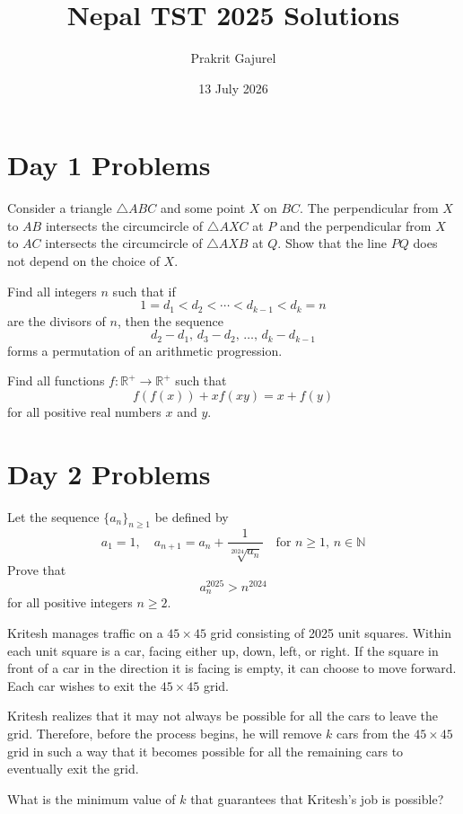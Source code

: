 \documentclass[11pt]{scrartcl}
\begin{document}
\title{Nepal TST 2025 Solutions}
\author{Prakrit Gajurel}
\date{13 July 2026}
\maketitle

\section{Day 1 Problems}

\begin{problem}
    Consider a triangle $\triangle ABC$ and some point $X$ on $BC$. The perpendicular from
    $X$ to $AB$ intersects the circumcircle of $\triangle AXC$ at $P$ and the perpendicular
    from $X$ to $AC$ intersects the circumcircle of $\triangle AXB$ at $Q$. Show that the
    line $PQ$ does not depend on the choice of $X$.
\end{problem}

\begin{problem}
    Find all integers $n$ such that if
    \[
    1 = d_1 < d_2 < \cdots < d_{k-1} < d_k = n
    \]
    are the divisors of $n$, then the sequence
    \[
    d_2 - d_1,\, d_3 - d_2,\, \ldots,\, d_k - d_{k-1}
    \]
    forms a permutation of an arithmetic progression.
\end{problem}

\begin{problem}
    Find all functions $f : \mathbb{R}^+ \rightarrow \mathbb{R}^+$ such that
    \[f(f(x)) + xf(xy) = x + f(y)\]
    for all positive real numbers $x$ and $y$.
\end{problem}

\newpage

\section{Day 2 Problems}

\begin{problem}
    Let the sequence $\{a_n\}_{n \geq 1}$ be defined by
    \[
    a_1 = 1, \quad a_{n+1} = a_n + \frac{1}{\sqrt[2024]{a_n}} \quad \text{for } n \geq 1, \, n \in \mathbb{N}
    \]
    Prove that
    \[
    a_n^{2025} >n^{2024}
    \]
    for all positive integers $n \geq 2$.
\end{problem}

\begin{problem}
    Kritesh manages traffic on a $45 \times 45$ grid consisting of 2025 unit squares. Within each unit square is a car, facing either up, down,
    left, or right. If the square in front of a car in the direction it is facing is empty, it can choose to move forward. Each car wishes to exit
    the $45 \times 45$ grid.

    Kritesh realizes that it may not always be possible for all the cars to leave the grid. Therefore, before the process begins, he will 
    remove $k$ cars from the $45 \times 45$ grid in such a way that it becomes possible for all the remaining cars to eventually exit the grid.

    What is the minimum value of $k$ that guarantees that Kritesh's job is possible?
\end{problem}
\end{document}
